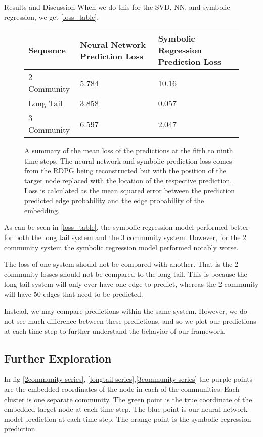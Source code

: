 \documentclass[12pt]{amsart}
\begin{document}
\begin{section}{Results and Discussion}
        When we do this for the SVD, NN, and symbolic regression, we get \autoref{loss_table}.
        \begin{figure}
            \begin{center}
                \begin{tabular}{| m{} | m{} | m{} |}
                    \hline
                    Sequence & Neural Network Prediction Loss & Symbolic Regression Prediction Loss\\ 
                    \hline
                    \hline
                    2 Community & 5.784 & 10.16\\ 
                    \hline 
                    Long Tail  & 3.858 & 0.057 \\ 
                    \hline 
                    3 Community & 6.597 & 2.047 \\ 
                    \hline 
                \end{tabular}
                \end{center}
                \caption{A summary of the mean loss of the predictions at the fifth to ninth time steps. The neural network and symbolic prediction loss comes from the RDPG being reconstructed but with the position of the target node replaced with the location of the respective prediction. Loss is calculated as the mean squared error between the prediction predicted edge probability and the edge probability of the embedding.}
                \label{loss_table}
        \end{figure}

        As can be seen in \autoref{loss_table}, the symbolic regression model performed better for both the long tail system and the 3 community system. However, for the 2 community system the symbolic regression model performed notably worse. 

        The loss of one system should not be compared with another. That is the 2 community losses should not be compared to the long tail. This is because the long tail system will only ever have one edge to predict, whereas the 2 community will have 50 edges that need to be predicted.

        Instead, we may compare predictions within the same system. However, we do not see much difference between these predictions, and so we plot our predictions at each time step to further understand the behavior of our framework.

    \subsection{Further Exploration}
        In fig \autoref{2community series}, \autoref{longtail series},\autoref{3community series} the purple points are the embedded coordinates of the node in each of the communities. Each cluster is one separate community. The green point is the true coordinate of the embedded target node at each time step. The blue point is our neural network model prediction at each time step. The orange point is the symbolic regression prediction. 
        

\end{section}
\end{document}
